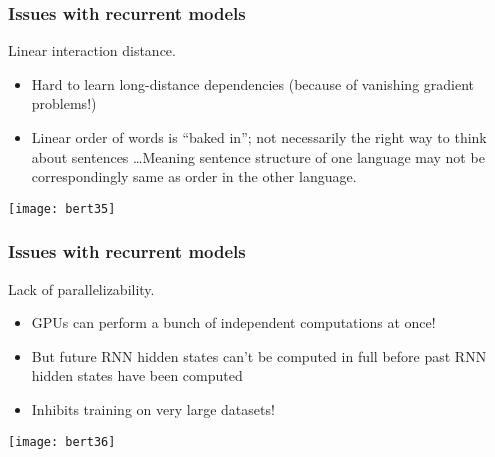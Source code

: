 \begin{frame}[fragile]\frametitle{Issues with recurrent models}


Linear interaction distance. %

\begin{itemize}
\item Hard to learn long-distance dependencies (because of vanishing gradient problems!)
\item Linear order of words is ``baked in''; not necessarily the  right way to think about sentences \ldots Meaning sentence structure of one language may not be correspondingly same as order in the other language.
\end{itemize}	 

\begin{center}
\texttt{[image: bert35]}
\end{center}	

 
\end{frame}

\begin{frame}[fragile]\frametitle{Issues with recurrent models}

Lack of parallelizability. %

\begin{itemize}
\item GPUs can perform a bunch of independent computations at once!
\item But future RNN hidden states can’t be computed in full before past RNN
hidden states have been computed
\item Inhibits training on very large datasets!
\end{itemize}	 

\begin{center}
\texttt{[image: bert36]}
\end{center}	

 
\end{frame}

